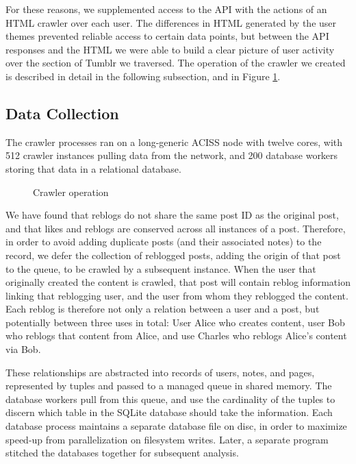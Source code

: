 For these reasons, we supplemented access to the API with the actions 
of an HTML crawler over each user.  The differences in HTML generated 
by the user themes prevented reliable access to certain data points, 
but between the API responses and the HTML we were able to build a 
clear picture of user activity over the section of Tumblr we 
traversed.  The operation of the crawler we created is described 
in detail in the following subsection, and in Figure \ref{crawler}.

\subsection{Data Collection}

The crawler processes ran on a long-generic ACISS node with twelve 
cores, with 512 crawler instances pulling data from the network, 
and 200 database workers storing that data in a relational database.

\begin{figure}
  
  \caption{Crawler operation}\label{crawler}
\end{figure}

We have found that reblogs do not share the same post ID as the original 
post, and that likes and reblogs are conserved across all instances of 
a post.  Therefore, in order to avoid adding duplicate posts (and their 
associated notes) to the record, we defer the collection of reblogged 
posts, adding the origin of that post to the queue, to be crawled by a 
subsequent instance.  When the user that originally created the content 
is crawled, that post will contain reblog information linking that 
reblogging user, and the user from whom they reblogged the content.  
Each reblog is therefore not only a relation between a user and a post, 
but potentially between three uses in total: User Alice who creates 
content, user Bob who reblogs that content from Alice, and use Charles 
who reblogs Alice's content via Bob.


These relationships are abstracted into records of users, notes, and pages, 
represented by tuples and passed to a managed queue in 
shared memory.  The database workers pull from this queue, and use 
the cardinality of the tuples to discern which table in the SQLite 
database should take the information.  Each database process 
maintains a separate database file on disc, in order to maximize 
speed-up from parallelization on filesystem writes.  Later, a 
separate program stitched the databases together for subsequent 
analysis.

